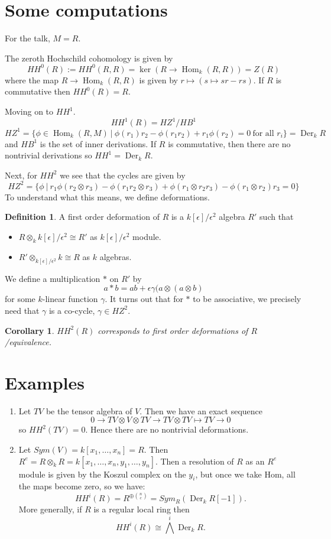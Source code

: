 \documentclass[12pt]{amsart}
\newtheorem{cor}[equation]{Corollary}
\theoremstyle{definition}
\newtheorem{defn}[equation]{Definition}
\newcommand{\Hom}{\operatorname{Hom}} %
\renewcommand{\to}{\longrightarrow}
\DeclareMathOperator{\Der}{Der}
\begin{document}
\section{Some computations}
For the talk, $M = R$.  
\medskip 

The zeroth Hochschild cohomology is given by 
$$HH^0(R) := HH^0(R,R) = \ker (R \to \Hom_k(R,R)) = Z(R)$$
where the map $R\to \Hom_k(R,R)$ is given by $r\mapsto (s\mapsto sr -rs)$.  If $R$ is commutative then $HH^0(R) = R$.  %
\medskip

Moving on to $HH^1$.  
$$HH^1(R) = HZ^1/HB^1$$
$$HZ^1 = \{ \phi \in \Hom_k(R,M) \ | \ \phi(r_1)r_2 - \phi(r_1r_2)+ r_1\phi(r_2) = 0 \ \mbox{for all } r_i\} = \Der_k R$$
and $HB^1$ is the set of inner derivations. If $R$ is commutative, then there are no nontrivial derivations so $HH^1 = \Der_k R$.
\medskip

Next, for $HH^2$ we see that the cycles are given by 
$$HZ^2 = \{\phi \ | \ r_1\phi(r_2\otimes r_3) - \phi(r_1r_2\otimes r_3) + \phi(r_1\otimes r_2r_3) - \phi(r_1\otimes r_2)r_3 = 0 \}$$
To understand what this means, we define deformations. 
\begin{defn}
A first order deformation of $R$ is a $k[\epsilon]/\epsilon^2$ algebra $R'$ such that 
\begin{itemize}
\item $R\otimes_k k[\epsilon]/\epsilon^2 \cong R'$ as $k[\epsilon]/\epsilon^2$ module.
\item $R' \otimes_{k[\epsilon]/\epsilon^2} k \cong R$ as $k$ algebras.  
\end{itemize}
\end{defn}
We define a multiplication $*$ on $R'$ by 
$$a*b  = ab + \epsilon \gamma(a\otimes(a\otimes b)$$ for some $k$-linear function $\gamma$.  It turns out that for $*$ to be associative, we precisely need that $\gamma$ is a co-cycle, $\gamma\in HZ^2$.  
\begin{cor}
$HH^2(R)$ corresponds to first order deformations of $R$/equivalence.
\end{cor}

\section{Examples}
\begin{enumerate}
\item 
Let $TV$ be the tensor algebra of $V$.  Then we have an exact sequence
$$0 \to TV \otimes V \otimes TV \to TV\otimes TV \mapsto TV \to 0$$
so $HH^2(TV) = 0.$  Hence there are no nontrivial deformations.
\item 
Let $Sym(V) = k[x_1,\ldots, x_n] = R$.   Then $R^e = R\otimes_k R = k[x_1,\ldots, x_n, y_1,\ldots, y_n]$.  
Then a resolution of $R$ as an $R^e$ module is given by the Koszul complex on the $y_i$, but once we take Hom, all the maps become zero, so we have:
$$HH^i(R) = R^{\oplus {n \choose c}} = Sym_R (\Der_kR[-1]).$$
More generally, if $R$ is a regular local ring then 
$$HH^i(R) \cong \bigwedge^i \Der_k R.$$
\end{enumerate}
\end{document}
